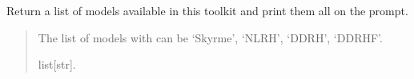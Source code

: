 \documentclass[letterpaper,10pt,english]{sphinxmanual}
\begin{document}
\begin{fulllineitems}
\label{\detokenize{source/api/setup_pheno_matter:nucleardatapy.setup_pheno_matter.models_pheno_matter}}
\pysigstartsignatures
\pysiglinewithargsret
{}
{}
{}
\pysigstopsignatures
\sphinxAtStartPar
Return a list of models available in this toolkit and print them all on the prompt.
\begin{quote}\begin{description}
\sphinxAtStartPar
The list of models with can be ‘Skyrme’, ‘NLRH’, ‘DDRH’, ‘DDRHF’.

\sphinxAtStartPar
list{[}str{]}.

\end{description}\end{quote}

\end{fulllineitems}

\end{document}
